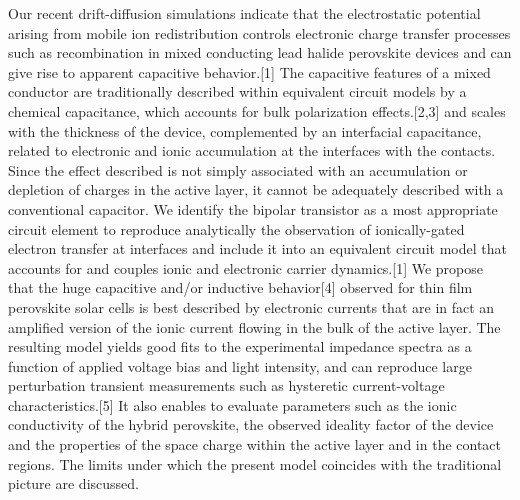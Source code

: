 


Our recent drift-diffusion simulations indicate that the electrostatic potential arising from mobile ion redistribution controls electronic charge transfer processes such as recombination in mixed conducting lead halide perovskite devices and can give rise to apparent capacitive behavior.[1] The capacitive features of a mixed conductor are traditionally described within equivalent circuit models by a chemical capacitance, which accounts for bulk polarization effects.[2,3] and scales with the thickness of the device, complemented by an interfacial capacitance, related to electronic and ionic accumulation at the interfaces with the contacts. Since the effect described is not simply associated with an accumulation or depletion of charges in the active layer, it cannot be adequately described with a conventional capacitor. We identify the bipolar transistor as a most appropriate circuit element to reproduce analytically the observation of ionically-gated electron transfer at interfaces and include it into an equivalent circuit model that accounts for and couples ionic and electronic carrier dynamics.[1] We propose that the huge capacitive and/or inductive behavior[4] observed for thin film perovskite solar cells is best described by electronic currents that are in fact an amplified version of the ionic current flowing in the bulk of the active layer. The resulting model yields good fits to the experimental impedance spectra as a function of applied voltage bias and light intensity, and can reproduce large perturbation transient measurements such as hysteretic current-voltage characteristics.[5] It also enables to evaluate parameters such as the ionic conductivity of the hybrid perovskite, the observed ideality factor of the device and the properties of the space charge within the active layer and in the contact regions. The limits under which the present model coincides with the traditional picture are discussed.

